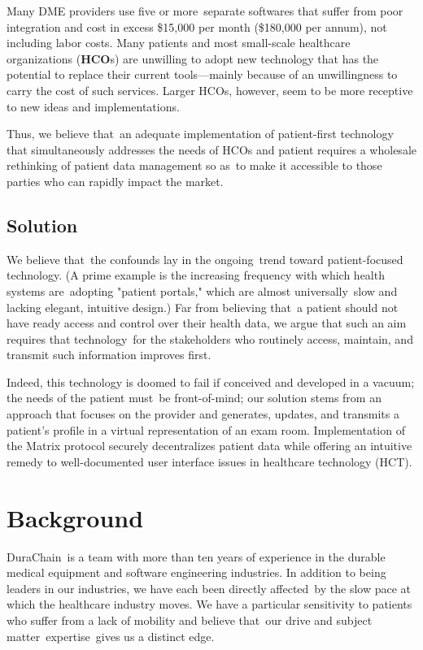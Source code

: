 \documentclass[letterpaper]{article}
\begin{document}
Many DME providers use five or more separate softwares that suffer from poor integration and cost in excess \$15,000 per month (\$180,000 per annum), not including labor costs. Many patients and most small-scale healthcare organizations (\textbf{HCO}s) are unwilling to adopt new technology that has the potential to replace their current tools---mainly because of an unwillingness to carry the cost of such services. Larger HCOs, however, seem to be more receptive to new ideas and implementations.﻿%

Thus, we believe that an adequate implementation of patient-first technology that simultaneously addresses the needs of HCOs and patient requires a wholesale rethinking of patient data management so as to make it accessible to those parties who can rapidly impact the market.%

\subsection{Solution}
We believe that the confounds lay in the ongoing trend toward patient-focused technology. (A prime example is the increasing frequency with which health systems are adopting "patient portals," which are almost universally slow and lacking elegant, intuitive design.) Far from believing that a patient should not have ready access and control over their health data, we argue that such an aim requires that technology for the stakeholders who routinely access, maintain, and transmit such information improves first.%

Indeed, this technology is doomed to fail if conceived and developed in a vacuum; the needs of the patient must be front-of-mind; our solution stems from an approach that focuses on the provider and generates, updates, and transmits a patient's profile in a virtual representation of an exam room. Implementation of the Matrix protocol securely decentralizes patient data while offering an intuitive remedy to well-documented user interface issues in healthcare technology (HCT).%

\section{Background}
DuraChain is a team with more than ten years of experience in the durable medical equipment and software engineering industries. In addition to being leaders in our industries, we have each been directly affected by the slow pace at which the healthcare industry moves. We have a particular sensitivity to patients who suffer from a lack of mobility and believe that our drive and subject matter expertise gives us a distinct edge.%
\end{document}
